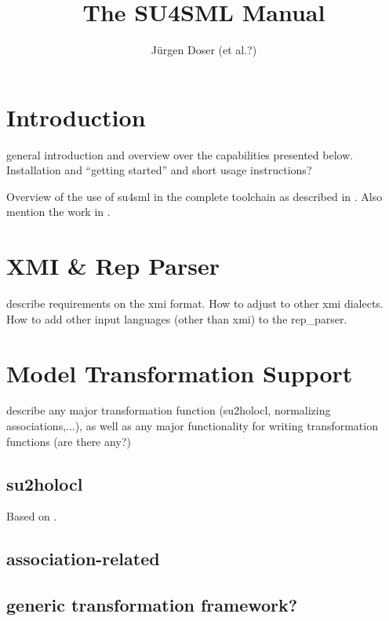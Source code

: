 \documentclass[bibtotoc,liststotoc]{scrbook}
\begin{document}
\titlehead{Information Security Group\\ETH Zurich}
\title{The SU4SML Manual}
\author{Jürgen Doser (et al.?)}
\maketitle

\tableofcontents
\chapter{Introduction}

general introduction and overview over the capabilities presented
below. Installation and ``getting started'' and short usage
instructions?  

Overview of the use of su4sml in the complete toolchain as described
in \cite{brucker.ea:mda:2006-b}.  Also mention the work in
\cite{marcel.beer:sa:2006,beer:generic:2007,brucker.ea:mda:2006-b}.
 
\chapter{XMI \& Rep Parser}

describe requirements on the xmi format. How to adjust to other xmi
dialects. How to add other input languages (other than xmi) to the
rep\_parser. 

\chapter{Model Transformation Support}

describe any major transformation function (su2holocl, normalizing
associations,...), as well as any major functionality for writing
transformation functions (are there any?)  

\section{su2holocl}

Based on \cite{crijke:transforming:2006}.

\section{association-related}

\section{generic transformation framework?}
\end{document}
